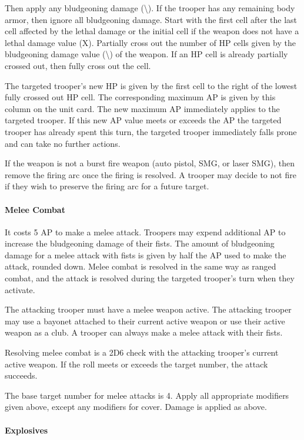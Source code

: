 Then apply any bludgeoning damage (\textbackslash).
If the trooper has any remaining body armor, then ignore all bludgeoning damage.
Start with the first cell after the last cell affected by the lethal damage or the initial cell if the weapon does not have a lethal damage value (X).
Partially cross out the number of HP cells given by the bludgeoning damage value (\textbackslash) of the weapon.
If an HP cell is already partially crossed out, then fully cross out the cell.

The targeted trooper's new HP is given by the first cell to the right of the lowest fully crossed out HP cell.
The corresponding maximum AP is given by this column on the unit card.
The new maximum AP immediately applies to the targeted trooper.
If this new AP value meets or exceeds the AP the targeted trooper has already spent this turn, the targeted trooper immediately falls prone and can take no further actions.

If the weapon is not a burst fire weapon (auto pistol, SMG, or laser SMG), then remove the firing arc once the firing is resolved.
A trooper may decide to not fire if they wish to preserve the firing arc for a future target.

\paragraph*{Melee Combat}

It costs 5 AP to make a melee attack.
Troopers may expend additional AP to increase the bludgeoning damage of their fists.
The amount of bludgeoning damage for a melee attack with fists is given by half the AP used to make the attack, rounded down.
Melee combat is resolved in the same way as ranged combat, and the attack is resolved during the targeted trooper's turn when they activate.

The attacking trooper must have a melee weapon active.
The attacking trooper may use a bayonet attached to their current active weapon or use their active weapon as a club.
A trooper can always make a melee attack with their fists.

Resolving melee combat is a 2D6 check with the attacking trooper's current active weapon.
If the roll meets or exceeds the target number, the attack succeeds.

The base target number for melee attacks is 4.
Apply all appropriate modifiers given above, except any modifiers for cover.
Damage is applied as above.

\paragraph*{Explosives}

